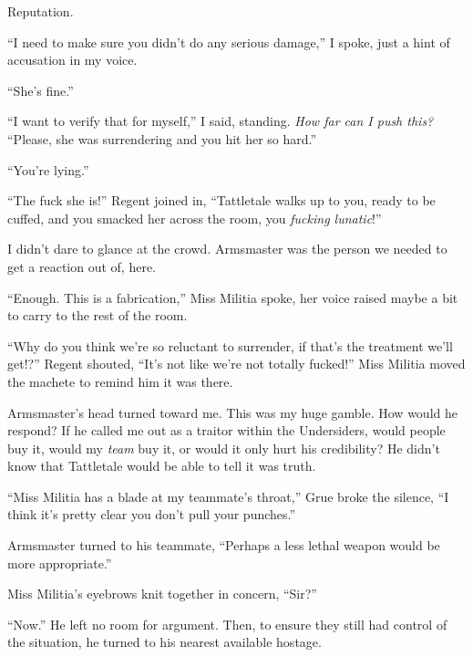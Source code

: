 Reputation.



``I need to make sure you didn't do any serious damage,'' I spoke, just a hint of accusation in my voice.



``She's fine.''



``I want to verify that for myself,'' I said, standing.  \emph{How far can I push this?}  ``Please, she was surrendering and you hit her so hard.''



``You're lying.''



``The fuck she is!'' Regent joined in, ``Tattletale walks up to you, ready to be cuffed, and you smacked her across the room, you \emph{fucking lunatic}!''



I didn't dare to glance at the crowd.  Armsmaster was the person we needed to get a reaction out of, here.



``Enough.  This is a fabrication,'' Miss Militia spoke, her voice raised maybe a bit to carry to the rest of the room.



``Why do you think we're so reluctant to surrender, if that's the treatment we'll get!?'' Regent shouted, ``It's not like we're not totally fucked!''  Miss Militia moved the machete to remind him it was there.



Armsmaster's head turned toward me.  This was my huge gamble.  How would he respond?  If he called me out as a traitor within the Undersiders, would people buy it, would my \emph{team} buy it, or would it only hurt his credibility?  He didn't know that Tattletale would be able to tell it was truth.



``Miss Militia has a blade at my teammate's throat,'' Grue broke the silence, ``I think it's pretty clear you don't pull your punches.''



Armsmaster turned to his teammate, ``Perhaps a less lethal weapon would be more appropriate.''



Miss Militia's eyebrows knit together in concern, ``Sir?''



``Now.''  He left no room for argument.  Then, to ensure they still had control of the situation, he turned to his nearest available hostage.



